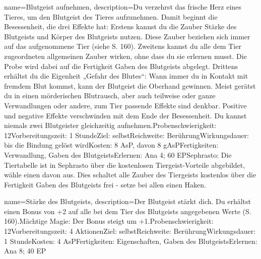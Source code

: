 {
    name={Blutgeist aufnehmen},
    description={Du verzehrst das frische Herz eines Tieres, um den Blutgeist des Tieres aufzunehmen. Damit beginnt die Besessenheit, die drei Effekte hat: Erstens kannst du die Zauber Stärke des Blutgeists und Körper des Blutgeists nutzen. Diese Zauber beziehen sich immer auf das aufgenommene Tier (siehe S. 160). Zweitens kannst du alle dem Tier zugeordneten allgemeinen Zauber wirken, ohne dass du sie erlernen musst. Die Probe wird dabei auf die Fertigkeit Gaben des Blutgeists abgelegt. Drittens erhältst du die Eigenheit „Gefahr des Blutes“: Wann immer du in Kontakt mit fremdem Blut kommst, kann der Blutgeist die Oberhand gewinnen. Meist gerätst du in einen mörderischen Blutrausch, aber auch teilweise oder ganze Verwandlungen oder andere, zum Tier passende Effekte sind denkbar. Positive und negative Effekte verschwinden mit dem Ende der Besessenheit. Du kannst niemals zwei Blutgeister gleichzeitig aufnehmen.\newline Probenschwierigkeit: 12\newline Vorbereitungszeit: 1 Stunde\newline Ziel: selbst\newline Reichweite: Berührung\newline Wirkungsdauer: bis die Bindung gelöst wird\newline Kosten: 8 AsP, davon 8 gAsP\newline Fertigkeiten: Verwandlung, Gaben des Blutgeists\newline Erlernen: Ana 4; 60 EP\newline Sephrasto: Die Tiertabelle ist in Sephrasto über die kostenlosen Tiergeist-Vorteile abgebildet, wähle einen davon aus. Dies schaltet alle Zauber des Tiergeists kostenlos über die Fertigkeit Gaben des Blutgeists frei - setze bei allen einen Haken.}
}


{
    name={Stärke des Blutgeists},
    description={Der Blutgeist stärkt dich. Du erhältst einen Bonus von +2 auf alle bei dem Tier des Blutgeists angegebenen Werte (S. 160).\newline Mächtige Magie: Der Bonus steigt um +1.\newline Probenschwierigkeit: 12\newline Vorbereitungszeit: 4 Aktionen\newline Ziel: selbst\newline Reichweite: Berührung\newline Wirkungsdauer: 1 Stunde\newline Kosten: 4 AsP\newline Fertigkeiten: Eigenschaften, Gaben des Blutgeists\newline Erlernen: Ana 8; 40 EP}
}


